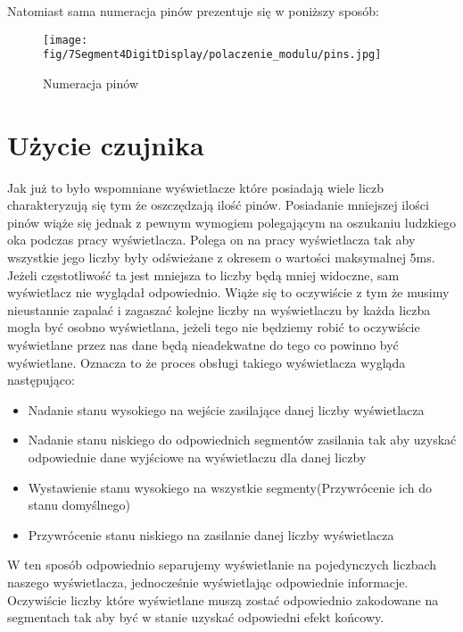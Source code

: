 \documentclass[11pt, a4paper]{article}
\begin{document}
Natomiast sama numeracja pinów prezentuje się w poniższy sposób:
\begin{figure}[H]
    \centering
    \texttt{[image: fig/7Segment4DigitDisplay/polaczenie\_modulu/pins.jpg]}
    \caption{Numeracja pinów}
\end{figure}



\newpage
\section{Użycie czujnika}
Jak już to było wspomniane wyświetlacze które posiadają wiele liczb charakteryzują się tym że oszczędzają ilość pinów.
Posiadanie mniejszej ilości pinów wiąże się jednak z pewnym wymogiem polegającym na oszukaniu ludzkiego oka podczas pracy wyświetlacza. Polega on na pracy wyświetlacza tak aby wszystkie jego liczby były odświeżane z okresem o wartości maksymalnej 5ms. Jeżeli częstotliwość ta jest mniejsza to liczby będą mniej widoczne, sam wyświetlacz nie wyglądał odpowiednio. Wiąże się to oczywiście z tym że musimy nieustannie zapalać i zagaszać kolejne liczby na wyświetlaczu by każda liczba mogła być osobno wyświetlana, jeżeli tego nie będziemy robić to oczywiście wyświetlane przez nas dane będą nieadekwatne do tego co powinno być wyświetlane. Oznacza to że proces obsługi takiego wyświetlacza wygląda następująco:
\begin{itemize}
    \item Nadanie stanu wysokiego na wejście zasilające danej liczby wyświetlacza
    \item Nadanie stanu niskiego do odpowiednich segmentów zasilania tak aby uzyskać odpowiednie dane wyjściowe na wyświetlaczu dla danej liczby
    \item Wystawienie stanu wysokiego na wszystkie segmenty(Przywrócenie ich do stanu domyślnego)
    \item Przywrócenie stanu niskiego na zasilanie danej liczby wyświetlacza
\end{itemize}
W ten sposób odpowiednio separujemy wyświetlanie na pojedynczych liczbach naszego wyświetlacza, jednocześnie wyświetlając odpowiednie informacje. Oczywiście liczby które wyświetlane muszą zostać odpowiednio zakodowane na segmentach tak aby być w stanie uzyskać odpowiedni efekt końcowy.
\end{document}
